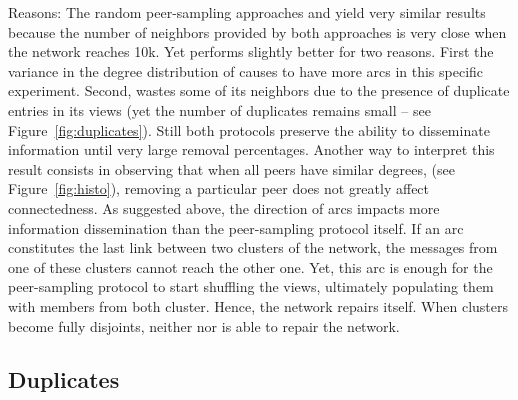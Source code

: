 \begin{asparadesc}
\item[Reasons:] The random peer-sampling approaches \CYCLON and \SPRAY yield
  very similar results because the number of neighbors provided by both
  approaches is very close when the network reaches 10k.  Yet \CYCLON performs
  slightly better for two reasons. First the variance in the degree distribution
  of \SPRAY causes \CYCLON to have more arcs in this specific
  experiment. Second, \SPRAY wastes some of its neighbors due to the presence of
  duplicate entries in its views (yet the number of duplicates remains small --
  see Figure~\ref{fig:duplicates}). Still both protocols preserve the ability to
  disseminate information until very large removal percentages. Another way to
  interpret this result consists in observing that when all peers have similar
  degrees, (see Figure~\ref{fig:histo}), removing a particular peer does not
  greatly affect connectedness. As suggested above, the direction of arcs
  impacts more information dissemination than the peer-sampling protocol
  itself. If an arc constitutes the last link between two clusters of the
  network, the messages from one of these clusters cannot reach the other
  one. Yet, this arc is enough for the peer-sampling protocol to start shuffling
  the views, ultimately populating them with members from both cluster. Hence,
  the network repairs itself.  When clusters become fully disjoints, neither
  \CYCLON nor \SPRAY is able to repair the network.

\end{asparadesc}

\subsection{Duplicates}

